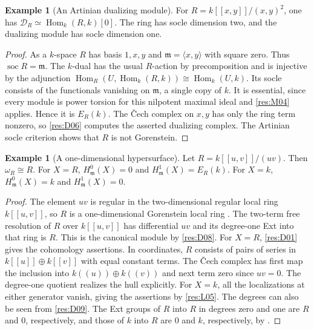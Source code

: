 \documentclass[11pt,oneside,openany]{book}
\theoremstyle{definition}
\newtheorem{example}[theorem]{Example}
\theoremstyle{remark}
\begin{document}
\begin{example}[An Artinian dualizing module]\label{res:E02}
For $R=k[[x,y]]/(x,y)^2$, one has
$\mathcal D_R\simeq\operatorname{Hom}_k(R,k)[0]$.
The ring has socle dimension two, and the dualizing module
has socle dimension one.
\end{example}
\begin{proof}
As a $k$-space $R$ has basis $1,x,y$ and
$\mathfrak m=\langle x,y\rangle$ with square zero.
Thus $\operatorname{soc}R=\mathfrak m$. The $k$-dual has the
usual $R$-action by precomposition and is injective by the
adjunction $\operatorname{Hom}_R(U,\operatorname{Hom}_k(R,k))
\cong\operatorname{Hom}_k(U,k)$. Its socle consists of the
functionals vanishing on $\mathfrak m$, a single copy of $k$.
It is essential, since every module is power torsion for this
nilpotent maximal ideal and \ref{res:M04} applies. Hence it is
$E_R(k)$. The \v{C}ech complex on $x,y$ has only the ring
term nonzero, so \ref{res:D06} computes the asserted dualizing
complex. The Artinian socle criterion
\cite[GC-05--GC-06]{core} shows that $R$ is not Gorenstein.
\end{proof}

\begin{example}[A one-dimensional hypersurface]\label{res:E03}
Let $R=k[[u,v]]/(uv)$. Then $\omega_R\cong R$. For $X=R$,
$H^0_{\mathfrak m}(X)=0$ and $H^1_{\mathfrak m}(X)=E_R(k)$.
For $X=k$, $H^0_{\mathfrak m}(X)=k$ and $H^1_{\mathfrak m}(X)=0$.
\end{example}
\begin{proof}
The element $uv$ is regular in the two-dimensional regular
local ring $k[[u,v]]$, so $R$ is a one-dimensional Gorenstein
local ring \cite[CM-02 and GC-07]{core}. The two-term free
resolution of $R$ over $k[[u,v]]$ has differential $uv$ and its
degree-one Ext into that ring is $R$. This is the canonical
module by \ref{res:D08}. For $X=R$, \ref{res:D01} gives the
cohomology assertions. In coordinates, $R$ consists of pairs
of series in $k[[u]]\oplus k[[v]]$ with equal constant terms.
The \v{C}ech complex has first map the inclusion into
$k((u))\oplus k((v))$ and next term zero since $uv=0$.
The degree-one quotient realizes the hull explicitly. For
$X=k$, all the localizations at either generator vanish, giving
the assertions by \ref{res:L05}. The degrees can also be seen
from \ref{res:D09}. The Ext groups of $R$ into $R$ in degrees
zero and one are $R$ and $0$, respectively, and those of $k$
into $R$ are $0$ and $k$, respectively, by
\cite[GC-06]{core}.
\end{proof}
\end{document}
